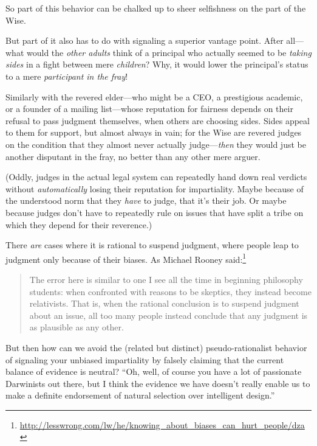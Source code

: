 {
 So part of this behavior can be chalked up to sheer selfishness on
the part of the Wise.}

{
 But part of it also has to do with signaling a superior vantage
point. After all---what would the \textit{other adults} think of a
principal who actually seemed to be \textit{taking sides} in a fight
between mere \textit{children}? Why, it would lower the
principal's status to a mere \textit{participant in the
fray}!}

{
 Similarly with the revered elder---who might be a CEO, a
prestigious academic, or a founder of a mailing list---whose reputation
for fairness depends on their refusal to pass judgment themselves, when
others are choosing sides. Sides appeal to them for support, but almost
always in vain; for the Wise are revered judges on the condition that
they almost never actually judge---\textit{then} they would just be
another disputant in the fray, no better than any other mere arguer.}

{
 (Oddly, judges in the actual legal system can repeatedly hand down
real verdicts without \textit{automatically} losing their reputation
for impartiality. Maybe because of the understood norm that they
\textit{have} to judge, that it's their job. Or maybe
because judges don't have to repeatedly rule on issues
that have split a tribe on which they depend for their reverence.)}

{
 There \textit{are} cases where it is rational to suspend judgment,
where people leap to judgment only because of their biases. As Michael
Rooney said:\footnote{\url{http://lesswrong.com/lw/he/knowing_about_biases_can_hurt_people/dza}}}

\begin{quote}
{
 The error here is similar to one I see all the time in beginning
philosophy students: when confronted with reasons to be skeptics, they
instead become relativists. That is, when the rational conclusion is to
suspend judgment about an issue, all too many people instead conclude
that any judgment is as plausible as any other.}
\end{quote}

{
 But then how can we avoid the (related but distinct)
pseudo-rationalist behavior of signaling your unbiased impartiality by
falsely claiming that the current balance of evidence is neutral?
``Oh, well, of course you have a lot of passionate
Darwinists out there, but I think the evidence we have
doesn't really enable us to make a definite endorsement
of natural selection over intelligent design.''}

